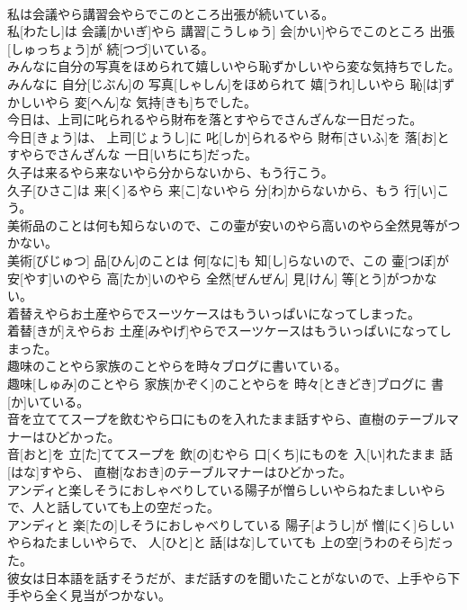 \documentclass[8pt]{extreport}
\begin{document}
\begin{CJK}{UTF8}{min}
\\	私は会議やら講習会やらでこのところ出張が続いている。	
\\	私[わたし]は 会議[かいぎ]やら 講習[こうしゅう] 会[かい]やらでこのところ 出張[しゅっちょう]が 続[つづ]いている。
\\	みんなに自分の写真をほめられて嬉しいやら恥ずかしいやら変な気持ちでした。	
\\	みんなに 自分[じぶん]の 写真[しゃしん]をほめられて 嬉[うれ]しいやら 恥[は]ずかしいやら 変[へん]な 気持[きも]ちでした。
\\	今日は、上司に叱られるやら財布を落とすやらでさんざんな一日だった。	
\\	今日[きょう]は、 上司[じょうし]に 叱[しか]られるやら 財布[さいふ]を 落[お]とすやらでさんざんな 一日[いちにち]だった。
\\	久子は来るやら来ないやら分からないから、もう行こう。	
\\	久子[ひさこ]は 来[く]るやら 来[こ]ないやら 分[わ]からないから、もう 行[い]こう。
\\	美術品のことは何も知らないので、この壷が安いのやら高いのやら全然見等がつかない。	
\\	美術[びじゅつ] 品[ひん]のことは 何[なに]も 知[し]らないので、この 壷[つぼ]が 安[やす]いのやら 高[たか]いのやら 全然[ぜんぜん] 見[けん] 等[とう]がつかない。
\\	着替えやらお土産やらでスーツケースはもういっぱいになってしまった。	
\\	着替[きが]えやらお 土産[みやげ]やらでスーツケースはもういっぱいになってしまった。
\\	趣味のことやら家族のことやらを時々ブログに書いている。	
\\	趣味[しゅみ]のことやら 家族[かぞく]のことやらを 時々[ときどき]ブログに 書[か]いている。
\\	音を立ててスープを飲むやら口にものを入れたまま話すやら、直樹のテーブルマナーはひどかった。	
\\	音[おと]を 立[た]ててスープを 飲[の]むやら 口[くち]にものを 入[い]れたまま 話[はな]すやら、 直樹[なおき]のテーブルマナーはひどかった。
\\	アンディと楽しそうにおしゃべりしている陽子が憎らしいやらねたましいやらで、人と話していても上の空だった。	
\\	アンディと 楽[たの]しそうにおしゃべりしている 陽子[ようし]が 憎[にく]らしいやらねたましいやらで、 人[ひと]と 話[はな]していても 上の空[うわのそら]だった。
\\	彼女は日本語を話すそうだが、まだ話すのを聞いたことがないので、上手やら下手やら全く見当がつかない。	

\end{CJK}
\end{document}
